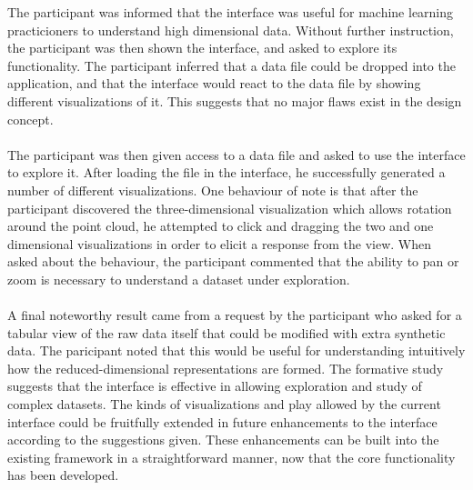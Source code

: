 \documentclass{sigchi}
\begin{document}
The participant was informed that the interface was useful for machine learning practicioners to understand high dimensional data. %
%
Without further instruction, the participant was then shown the interface, and asked to explore its functionality. %
%
The participant inferred that a data file could be dropped into the application, and that the interface would react to the data file by showing different visualizations of it. %
%
This suggests that no major flaws exist in the design concept. %
%
\\\\
%
The participant was then given access to a data file and asked to use the interface to explore it. %
%
After loading the file in the interface, he successfully generated a number of different visualizations. %
%
One behaviour of note is that after the participant discovered the three-dimensional visualization which allows rotation around the point cloud, he attempted to click and dragging the two and one dimensional visualizations in order to elicit a response from the view. %
%
When asked about the behaviour, the participant commented that the ability to pan or zoom is necessary to understand a dataset under exploration. %
%
\\\\
%
A final noteworthy result came from a request by the participant who asked for a tabular view of the raw data itself that could be modified with extra synthetic data. %
%
The paricipant noted that this would be useful for understanding intuitively how the reduced-dimensional representations are formed. %
%
The formative study suggests that the interface is effective in allowing exploration and study of complex datasets. %
%
The kinds of visualizations and play allowed by the current interface could be fruitfully extended in future enhancements to the interface according to the suggestions given. %
%
These enhancements can be built into the existing framework in a straightforward manner, now that the core functionality has been developed. %
%
\end{document}
